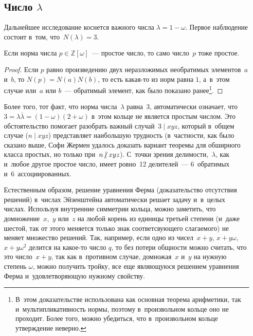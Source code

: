 \documentclass{article}
\begin{document}
\subsection{Число $\lambda$}

Дальнейшее исследование коснется важного числа $\lambda = 1 - \omega$. Первое
наблюдение состоит в~том, что~$N(\lambda) = 3$.

\begin{claim}
  Если норма числа $p \in \mathbb{Z}[\omega]$~--- простое число, то само
  число~$p$ тоже простое.
\end{claim}
\begin{proof}
  Если $p$ равно произведению двух неразложимых необратимых элементов~$a$ и~$b$,
  то $N(p)=N(a)N(b)$, то есть какая-то из норм равна $1$, а~в~этом случае
  или~$a$ или $b$~--- обратимый элемент, как было показано ранее\footnote{
  В~этом доказательстве использована как основная теорема арифметики, так
  и~мультипликативность нормы, поэтому в~произвольном кольце оно не проходит.
  Более того, можно убедиться, что в~произвольном кольце утверждение неверно.}.
\end{proof}

Более того, тот факт, что норма числа~$\lambda$ равна~$3$, автоматически
означает, что~$3 = \lambda \overline{\lambda} = (1 - \omega)(2 + \omega)$ в~этом
кольце не является простым числом. Это обстоятельство помогает разобрать важный
случай~$3 \mid xyz$, который в~общем случае ($n \mid xyz$) представляет
наибольшую трудность (в~частности, как было сказано выше, Софи Жермен удалось
доказать вариант теоремы для обширного класса простых, но только
при~$n \ndiv xyz$). С~точки зрения делимости,~$\lambda$, как и~любое другое
простое число, имеет ровно~12 делителей~--- 6~обратимых и~6~ассоциированных.

Естественным образом, решение уравнения Ферма (доказательство отсутствия
решений) в~числах Эйзенштейна автоматически решает задачу и~в~целых числах.
Используя внутренние симметрии кольца, можно заметить, что домножение~$x$,~$y$
или~$z$ на любой корень из единицы третьей степени (и~даже шестой, так от этого
меняется только знак соответсвующего слагаемого) не меняет множество решений.
Так, например, если одно из чисел~$x + y$, $x + y\omega$, $x + y\omega^2$
делится на какое-то число $q$, то без потери общности можно считать, что
это число~$x + y$, так как в~противном случае, домножая~$x$ и~$y$ на нужную
степень $\omega$, можно получить тройку, все еще являющуюся решением уравнения
Ферма и~удовлетворяющую нужному свойству.
\end{document}
